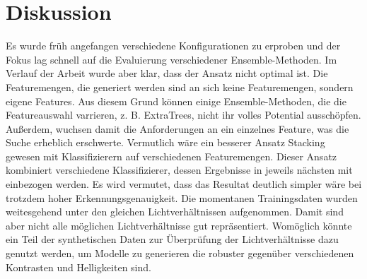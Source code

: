 \chapter{Diskussion}
Es wurde früh angefangen verschiedene Konfigurationen zu erproben und der Fokus lag schnell auf die Evaluierung verschiedener Ensemble-Methoden. Im Verlauf der Arbeit wurde aber klar, dass der Ansatz
nicht optimal ist. Die Featuremengen, die generiert werden sind an sich keine Featuremengen, sondern eigene Features. Aus diesem Grund können einige Ensemble-Methoden, die die Featureauswahl varrieren,
z. B. ExtraTrees, nicht ihr volles Potential ausschöpfen. Außerdem, wuchsen damit die Anforderungen an ein einzelnes Feature, was die Suche erheblich erschwerte. Vermutlich wäre ein besserer Ansatz Stacking
gewesen mit Klassifizierern auf verschiedenen Featuremengen. Dieser Ansatz kombiniert verschiedene Klassifizierer, dessen Ergebnisse in jeweils nächsten mit einbezogen werden. Es wird vermutet, dass
das Resultat deutlich simpler wäre bei trotzdem hoher Erkennungsgenauigkeit.
\newline
\newline
Die momentanen Trainingsdaten wurden weitesgehend unter den gleichen Lichtverhältnissen aufgenommen. Damit sind aber nicht alle möglichen Lichtverhältnisse gut repräsentiert. Womöglich könnte ein
Teil der synthetischen Daten zur Überprüfung der Lichtverhältnisse dazu genutzt werden, um Modelle zu generieren die robuster gegenüber verschiedenen Kontrasten und Helligkeiten sind.